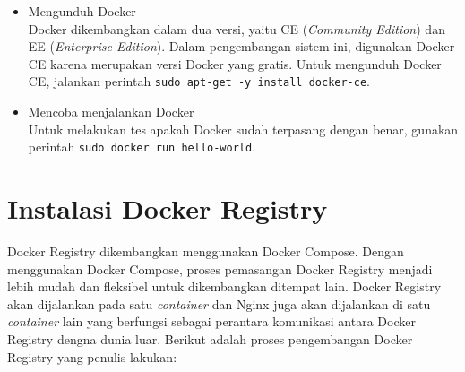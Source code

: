 \begin{itemize}
    \item Mengunduh Docker \\
    	Docker dikembangkan dalam dua versi, yaitu CE (\textit{Community Edition}) dan EE (\textit{Enterprise Edition}). Dalam pengembangan sistem ini, digunakan Docker CE karena merupakan versi Docker yang gratis. Untuk mengunduh Docker CE, jalankan perintah \texttt{sudo apt-get -y install docker-ce}.
    
    \item Mencoba menjalankan Docker \\
    	Untuk melakukan tes apakah Docker sudah terpasang dengan benar, gunakan perintah \texttt{sudo docker run hello-world}.
    \end{itemize}

\section*{Instalasi Docker Registry} \label{install:dockerRegistry}
	Docker Registry dikembangkan menggunakan Docker Compose. Dengan menggunakan Docker Compose, proses pemasangan Docker Registry menjadi lebih mudah dan fleksibel untuk dikembangkan ditempat lain. Docker Registry akan dijalankan pada satu \textit{container} dan Nginx juga akan dijalankan di satu \textit{container} lain yang berfungsi sebagai perantara komunikasi antara Docker Registry dengna dunia luar. Berikut adalah proses pengembangan Docker Registry yang penulis lakukan:
